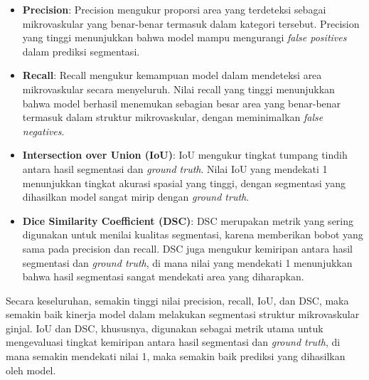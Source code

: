 \begin{itemize}
	\item \textbf{Precision}: Precision mengukur proporsi area yang terdeteksi sebagai mikrovaskular yang benar-benar termasuk dalam kategori tersebut. Precision yang tinggi menunjukkan bahwa model mampu mengurangi \textit{false positives} dalam prediksi segmentasi.
	
	\item \textbf{Recall}: Recall mengukur kemampuan model dalam mendeteksi area mikrovaskular secara menyeluruh. Nilai recall yang tinggi menunjukkan bahwa model berhasil menemukan sebagian besar area yang benar-benar termasuk dalam struktur mikrovaskular, dengan meminimalkan \textit{false negatives}.
	
	\item \textbf{Intersection over Union (IoU)}: IoU mengukur tingkat tumpang tindih antara hasil segmentasi dan \textit{ground truth}. Nilai IoU yang mendekati 1 menunjukkan tingkat akurasi spasial yang tinggi, dengan segmentasi yang dihasilkan model sangat mirip dengan \textit{ground truth}.
	
	\item \textbf{Dice Similarity Coefficient (DSC)}: DSC merupakan metrik yang sering digunakan untuk menilai kualitas segmentasi, karena memberikan bobot yang sama pada precision dan recall. DSC juga mengukur kemiripan antara hasil segmentasi dan \textit{ground truth}, di mana nilai yang mendekati 1 menunjukkan bahwa hasil segmentasi sangat mendekati area yang diharapkan.
\end{itemize}

Secara keseluruhan, semakin tinggi nilai precision, recall, IoU, dan DSC, maka semakin baik kinerja model dalam melakukan segmentasi struktur mikrovaskular ginjal. IoU dan DSC, khususnya, digunakan sebagai metrik utama untuk mengevaluasi tingkat kemiripan antara hasil segmentasi dan \textit{ground truth}, di mana semakin mendekati nilai 1, maka semakin baik prediksi yang dihasilkan oleh model.

